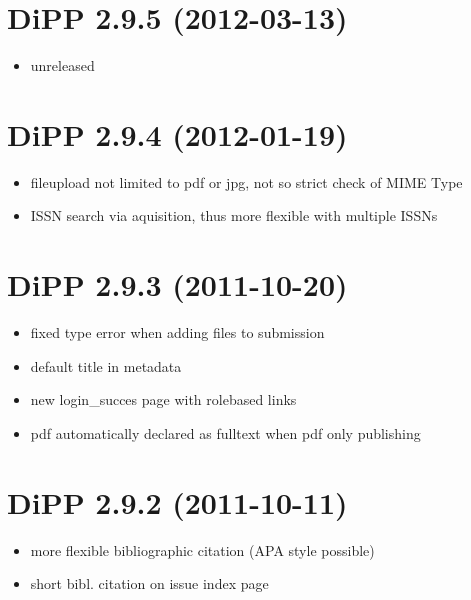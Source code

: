 \documentclass[a4paper,10pt,ngerman]{sphinxmanual}
\begin{document}
\section{DiPP 2.9.5 (2012-03-13)}
\label{changelog:dipp-2-9-5-2012-03-13}\begin{itemize}
\item {} 
unreleased

\end{itemize}


\section{DiPP 2.9.4 (2012-01-19)}
\label{changelog:dipp-2-9-4-2012-01-19}\begin{itemize}
\item {} 
fileupload not limited to pdf or jpg, not so strict check of MIME Type

\item {} 
ISSN search via aquisition, thus more flexible with multiple ISSNs

\end{itemize}


\section{DiPP 2.9.3 (2011-10-20)}
\label{changelog:dipp-2-9-3-2011-10-20}\begin{itemize}
\item {} 
fixed type error when adding files to submission

\item {} 
default title in metadata

\item {} 
new login\_succes page with rolebased links

\item {} 
pdf automatically declared as fulltext when pdf only publishing

\end{itemize}


\section{DiPP 2.9.2 (2011-10-11)}
\label{changelog:dipp-2-9-2-2011-10-11}\begin{itemize}
\item {} 
more flexible bibliographic citation (APA style possible)

\item {} 
short bibl. citation on issue index page

\end{itemize}
\end{document}
